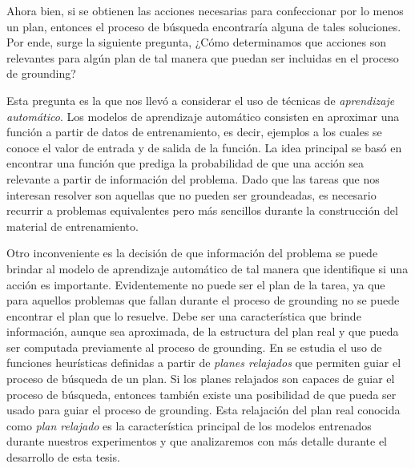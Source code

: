 Ahora bien, si se obtienen las acciones necesarias para confeccionar por lo
menos un plan, entonces el proceso de búsqueda encontraría alguna de tales
soluciones. Por ende, surge la siguiente pregunta, ¿Cómo determinamos que
acciones son relevantes para algún plan de tal manera que puedan ser incluidas
en el proceso de grounding?

Esta pregunta es la que nos llevó a considerar el uso de técnicas de
\emph{aprendizaje automático}. Los modelos de aprendizaje automático consisten en aproximar una función a partir de datos de entrenamiento, es decir, ejemplos a los cuales se conoce el valor de entrada y de salida de la función. La idea principal se basó en encontrar una función que prediga la probabilidad de que una acción sea relevante a partir de información del problema. Dado que las tareas que
nos interesan resolver son aquellas que no pueden ser groundeadas, es necesario recurrir a problemas equivalentes pero más sencillos durante la construcción del material de entrenamiento.

Otro inconveniente es la decisión de que información del problema se puede brindar al modelo de aprendizaje automático de tal manera que identifique si una acción es importante. Evidentemente no puede ser el plan de la tarea, ya que para aquellos problemas que fallan durante el proceso de grounding no se puede encontrar el plan que lo resuelve. Debe ser una característica que brinde información, aunque sea aproximada, de la estructura del plan real y que pueda ser computada previamente al proceso de grounding. En \citep{hoffman-2001} se estudia el uso de funciones heurísticas definidas a partir de \emph{planes relajados} que permiten guiar el proceso de búsqueda de un plan. Si los planes relajados son capaces de guiar el proceso de búsqueda, entonces también existe una posibilidad de que pueda ser usado para guiar el proceso de grounding. Esta relajación del plan real conocida como \emph{plan relajado} es la característica principal de los modelos entrenados durante nuestros experimentos y que analizaremos con más detalle durante el desarrollo de esta tesis.

